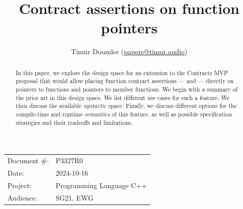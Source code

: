 

 \usepackage[bottom]{footmisc} 

 \usepackage{longtable}


\usepackage{tikz,lipsum,lmodern}
\usepackage[most]{tcolorbox}



\usepackage{titlesec}
\usepackage{tocloft}


\newcommand{\changelocaltocdepth}[1]{%
  \addtocontents{toc}{\protect\setcounter{tocdepth}{#1}}%
  \setcounter{tocdepth}{#1}%
}

\setcounter{tocdepth}{3}



\title{Contract assertions on function pointers}
\author{ Timur Doumler \small(\href{mailto:papers@timur.audio}{papers@timur.audio}) 
}
\date{}
\maketitle

\begin{tabular}{ll}
Document \#: & P3327R0 \\
Date: &2024-10-16 \\
Project: & Programming Language C++ \\
Audience: & SG21, EWG
\end{tabular}

\begin{abstract}
In this paper, we explore the design space for an extension to the Contracts MVP proposal \cite{P2900R9} that would allow placing function contract assertions ---  and  --- directly on pointers to functions and pointers to member functions. We begin  with a summary of the prior art in this design space. We list different use cases for such a feature. We then discuss the available \emph{syntactic} space. Finally, we discuss different  options for the compile-time and runtime \emph{semantics} of this feature, as well as possible specification strategies and their tradeoffs and limitations.
\end{abstract}

